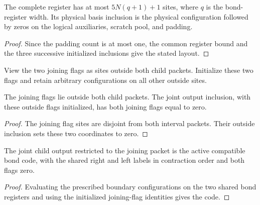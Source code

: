 \begin{lemma}
    \label{thm:mpu_complete_register}
    \leanok
    The complete register has at most $5N(q+1)+1$ sites, where $q$ is the
    bond-register width. Its physical basis inclusion is the physical configuration
    followed by zeros on the logical auxiliaries, scratch pool, and padding.
\end{lemma}
\begin{proof}\leanok
    Since the padding count is at most one, the common register bound and
    the three successive initialized inclusions give the stated layout.
\end{proof}

\begin{definition}
    \label{def:mpu_joint_flags}
    \leanok
    View the two joining flags as sites outside both child packets. Initialize
    these two flags and retain arbitrary configurations on all other outside sites.
\end{definition}

\begin{lemma}
    \label{thm:mpu_joint_flags}
    \leanok
    The joining flags lie outside both child packets. The joint output inclusion,
    with these outside flags initialized, has both joining flags equal to zero.
\end{lemma}
\begin{proof}\leanok
    The joining flag sites are disjoint from both interval packets. Their outside
    inclusion sets these two coordinates to zero.
\end{proof}

\begin{lemma}
    \label{thm:mpu_actual_packet_encoding}
    \leanok
    The joint child output restricted to the joining packet is
    the active compatible bond code, with the shared right and left labels in
    contraction order and both flags zero.
\end{lemma}
\begin{proof}\leanok
    Evaluating the prescribed boundary configurations on the two shared bond
    registers and using the initialized joining-flag identities gives the code.
\end{proof}

